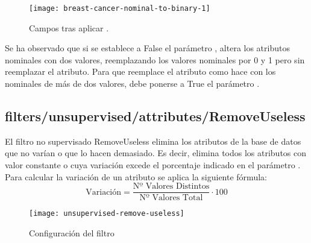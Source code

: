 \begin{figure}[ht]
    \centering
    \texttt{[image: breast-cancer-nominal-to-binary-1]}
    \caption{Campos tras aplicar .}
    \label{fig:breast-cancer-nominal-to-binary-1}
\end{figure}

Se ha observado que si se establece a False el parámetro \code{}, altera los atributos nominales con dos valores, reemplazando los valores nominales por 0 y 1 pero sin reemplazar el atributo. Para que reemplace el atributo como hace con los nominales de más de dos valores, debe ponerse a True el parámetro .

\subsection{filters/unsupervised/attributes/RemoveUseless}
El filtro no supervisado RemoveUseless elimina los atributos de la base de datos que no varían o que lo hacen demasiado. Es decir, elimina todos los atributos con valor constante o cuya variación excede el porcentaje indicado en el parámetro . Para calcular la variación de un atributo se aplica la siguiente fórmula:
\begin{equation*}
\text{Variación}=\dfrac{\text{Nº Valores Distintos}}{\text{Nº Valores Total}}\cdot100
\end{equation*}

\begin{figure}[ht]
    \centering
    \texttt{[image: unsupervised-remove-useless]}
    \caption{Configuración del filtro }
    \label{fig:unsupervised-remove-useless}
\end{figure}

